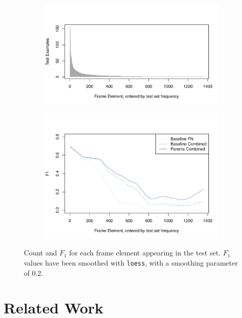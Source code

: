 \documentclass[11pt,a4paper]{article}
\begin{document}
\begin{figure}[t]
	\begin{subfigure}[b]{0.5\textwidth}
		\includegraphics[width=\textwidth]{fig/num_instances}
	\end{subfigure}
	\begin{subfigure}[b]{0.5\textwidth}
		\vspace{-1cm}
		\includegraphics[width=\textwidth]{fig/f1_sorted_by_num_instances}
	\end{subfigure}
	\caption{Count and $F_1$ for each frame element appearing in the test set. $F_1$ values have been smoothed with \texttt{loess}, with a smoothing parameter of 0.2.}
\end{figure}


\section{Related Work}
\end{document}
